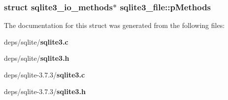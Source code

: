 \subsubsection{\setlength{\rightskip}{0pt plus 5cm}struct \bf{sqlite3\_\-io\_\-methods}$\ast$ \bf{sqlite3\_\-file::p\-Methods}}\label{structsqlite3__file_82bf9166e50a8f3cd10f7ee84c4a4986}




The documentation for this struct was generated from the following files:\begin{CompactItemize}
\item 
deps/sqlite/\bf{sqlite3.c}\item 
deps/sqlite/\bf{sqlite3.h}\item 
deps/sqlite-3.7.3/\bf{sqlite3.c}\item 
deps/sqlite-3.7.3/\bf{sqlite3.h}\end{CompactItemize}
